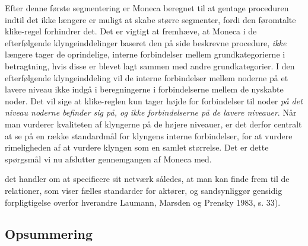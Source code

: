 Efter denne  første segmentering er Moneca beregnet til at gentage proceduren indtil det ikke længere er muligt at skabe større segmenter, fordi den føromtalte klike-regel forhindrer det. Det er vigtigt at fremhæve, at Moneca i de efterfølgende klyngeinddelinger baseret den på side \pageref{monecastepbystep} beskrevne procedure, \emph{ikke} længere tager de oprindelige, interne forbindelser mellem grundkategorierne i betragtning, hvis disse er blevet lagt sammen med andre grundkategorier. I den efterfølgende klyngeinddeling vil de interne forbindelser mellem noderne på et lavere niveau ikke indgå i beregningerne i forbindelserne mellem de nyskabte noder. Det vil sige at klike-reglen kun tager højde for forbindelser til noder \emph{på det niveau noderne befinder sig på, og ikke forbindelserne på de lavere niveauer}. Når man vurderer kvaliteten af klyngerne på de højere niveauer, er det derfor centralt at se på en række standardmål for klyngens interne forbindelser, for at vurdere rimeligheden af at vurdere klyngen som en samlet størrelse. Det er dette spørgsmål vi nu afslutter gennemgangen af Moneca med.






det
handler om at specificere sit netværk således, at man kan finde frem til de relationer,
som viser fælles standarder for aktører, og sandsynliggør gensidig forpligtigelse overfor
hverandre Laumann, Marsden og Prensky 1983, s. 33).







\subsection{Opsummering \label{}}
















